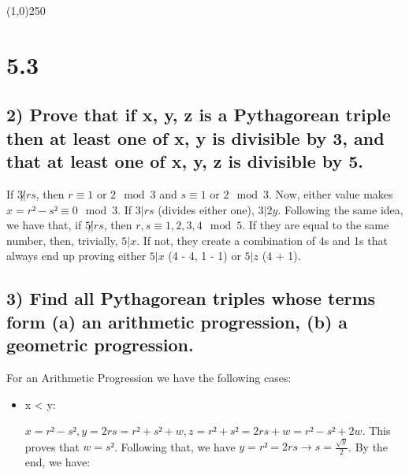 \documentclass[11pt]{article}
\begin{document}
\begin{center}
\line(1,0){250}
\end{center}

\section*{5.3}
\label{sec:org252419f}

\subsection*{2) Prove that if x, y, z is a Pythagorean triple then at least one of x, y is divisible by 3, and that at least one of x, y, z is divisible by 5.}
\label{sec:org72c4754}

If \(3\not|rs\), then \(r \equiv 1\) or \(2 \mod 3\) and \(s \equiv 1\) or \(2 \mod 3\). Now, either value makes \(x = r² - s² \equiv 0 \mod 3\). If \(3|rs\) (divides either one), \(3|2y\).
Following the same idea, we have that, if \(5\not|rs\), then \(r, s \equiv 1, 2, 3, 4 \mod 5\). If they are equal to the same number, then, trivially, \(5|x\). If not, they create a combination of 4s and 1s that always end up proving either \(5|x\) (4 - 4, 1 - 1) or \(5|z\) (4 + 1).

\subsection*{3) Find all Pythagorean triples whose terms form (a) an arithmetic progression, (b) a geometric progression.}
\label{sec:orgfb852c8}
For an Arithmetic Progression we have the following cases:
\begin{itemize}
\item x < y:

\(x = r² - s², y = 2rs = r² + s² + w, z = r² + s² = 2rs + w = r² - s² + 2w\). This proves that \(w = s²\). Following that, we have \(y = r² = 2rs \to s = \frac{\sqrt{y}}{2}\). By the end, we have:
\end{itemize}
\end{document}
